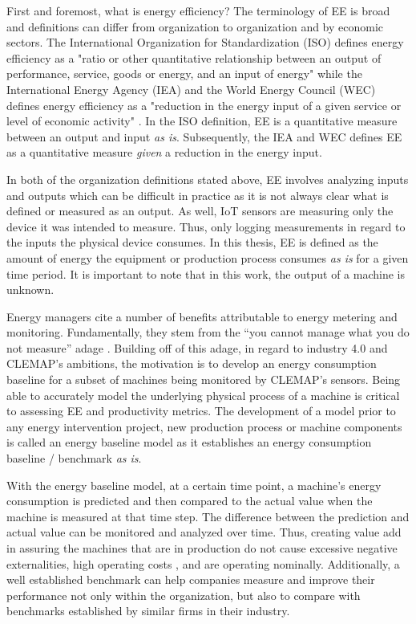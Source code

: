 First and foremost, what is energy efficiency? The terminology of EE is broad and definitions can differ from organization to organization and by economic sectors. The International Organization for Standardization (ISO) defines energy efficiency as a "ratio or other quantitative relationship between an output of performance, service, goods or energy, and an input of energy" \cite{ISO} while the International Energy Agency (IEA) and the World Energy Council (WEC) defines energy efficiency as a "reduction in the energy input of a given service or level of economic activity" \cite{iea-wec}. In the ISO definition, EE is a quantitative measure between an output and input \textit{as is}. Subsequently, the IEA and WEC defines EE as a quantitative measure \textit{given} a reduction in the energy input.

In both of the organization definitions stated above, EE involves analyzing inputs and outputs which can be difficult in practice as it is not always clear what is defined or measured as an output. As well, IoT sensors are measuring only the device it was intended to measure. Thus, only logging measurements in regard to the inputs the physical device consumes. In this thesis, EE is defined as the amount of energy the equipment or production process consumes \textit{as is} for a given time period. It is important to note that in this work, the output of a machine is unknown.  

Energy managers cite a number of benefits attributable to energy metering and monitoring. Fundamentally, they stem from the “you cannot manage what you do not measure” adage \cite{3M}. Building off of this adage, in regard to industry 4.0 and CLEMAP's ambitions, the motivation is to develop an energy consumption baseline for a subset of machines being monitored by CLEMAP's sensors. Being able to accurately model the underlying physical process of a machine is critical to assessing EE and productivity metrics. The development of a model prior to any energy intervention project, new production process or machine components is called an energy baseline model as it establishes an energy consumption baseline / benchmark \textit{as is}. 

With the energy baseline model, at a certain time point, a machine's energy consumption is predicted and then compared to the actual value when the machine is measured at that time step. The difference between the prediction and actual value can be monitored and analyzed over time. Thus, creating value add in assuring the machines that are in production do not cause excessive negative externalities, high operating costs \cite{eea}, and are operating nominally. Additionally, a well established benchmark can help companies measure and improve their performance not only within the organization, but also to compare with benchmarks established by similar firms in their industry.

